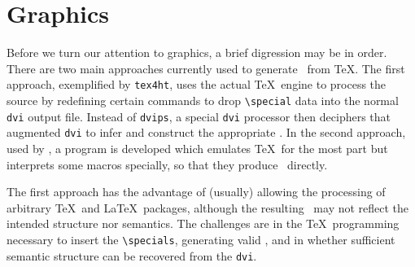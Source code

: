 \documentclass{llncs}
\begin{document}


\section{Graphics}\label{graphics}
Before we turn our attention to graphics,
a brief digression may be in order.
There are two main approaches currently used to generate
\HTML\ from \TeX. The first approach,
exemplified by \texttt{tex4ht}, uses the actual \TeX\ engine
to process the source by redefining certain commands to drop
\verb|\special| data into the normal \texttt{dvi} output file.
Instead of \texttt{dvips}, a special \texttt{dvi} processor then deciphers
that augmented \texttt{dvi}
to infer and construct the appropriate \HTML.
In the second approach, used by \LaTeXML, a program
is developed which emulates \TeX\ for the most part
but interprets some macros
specially, so that they produce \XML\ directly.

The first approach has the advantage of (usually)
allowing the processing of arbitrary \TeX\ and \LaTeX\ packages,
although the resulting \HTML\ may not reflect the intended
structure nor semantics.
The challenges are in the \TeX\ programming necessary to
insert the \verb|\specials|, generating valid \HTML,
and in whether sufficient semantic structure can be
recovered from the \texttt{dvi}.
\end{document}
